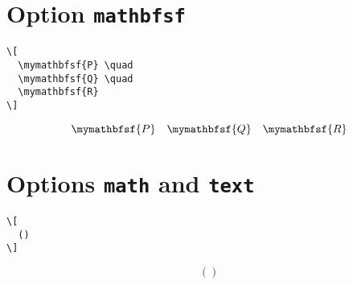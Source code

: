 \documentclass{article}
\begin{document}
\section{Option \texttt{mathbfsf}}

\begin{verbatim}
\[
  \mymathbfsf{P} \quad
  \mymathbfsf{Q} \quad
  \mymathbfsf{R}
\]
\end{verbatim}
%
\[
  \mymathbfsf{P} \quad
  \mymathbfsf{Q} \quad
  \mymathbfsf{R}
\]

\section{Options \texttt{math} and \texttt{text}}

\blindmathtrue
\blindtext
\blindmathfalse

\begin{verbatim}
\[
  ()
\]
\end{verbatim}
%
\[
  ()
\]
\end{document}

